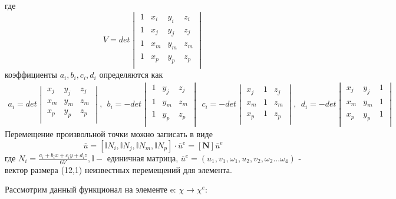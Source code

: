 \documentclass[a4paper,12pt]{article}
\begin{document}
где
\begin{equation}
    V = det
    \begin{vmatrix}
1 & x_i & y_i & z_i \\ 
1 & x_j & y_j & z_j \\ 
1 & x_m & y_m & z_m \\ 
1 & x_p & y_p & z_p \\
    \end{vmatrix}
\end{equation}
коэффициенты $a_i, b_i, c_i, d_i$ определяются как
\begin{align}
    a_i =    det 
    \begin{vmatrix}
 x_j & y_j & z_j \\ 
x_m & y_m & z_m \\ 
x_p & y_p & z_p \\
    \end{vmatrix},
\:\: b_i  = -det 
    \begin{vmatrix} 
1 & y_j & z_j \\ 
1 & y_m & z_m \\ 
1 & y_p & z_p \\
    \end{vmatrix}
\:\: c_i =     -det \begin{vmatrix}
 x_j & 1 & z_j \\ 
x_m & 1 & z_m \\ 
x_p & 1 & z_p \\
    \end{vmatrix},
\:\: d_i =     -det\begin{vmatrix}
 x_j & y_j & 1 \\ 
x_m & y_m & 1 \\ 
x_p & y_p & 1 \\
    \end{vmatrix}
\end{align}
Перемещение произвольной точки можно записать в виде 
\begin{equation}
    \overline{u} = [\mathbb{I} N_i,\mathbb{I} N_j,\mathbb{I} N_m,\mathbb{I} N_p] \cdot \overline{u}^e = [\textbf{N}] \overline{u}^e
\end{equation}
где $N_i = \frac{a_i + b_i x + c_i y + d_i z}{6V}, \mathbb{I} - $ единичная матрица, $\overline{u}^e = (u_1, v_1,\omega_1, u_2, v_2,  \omega_2 ...\omega_4) $ - вектор размера (12,1) неизвестных перемещений для элемента. \par
Рассмотрим данный функционал на элементе e: $\chi \rightarrow \chi^e$:
\end{document}
